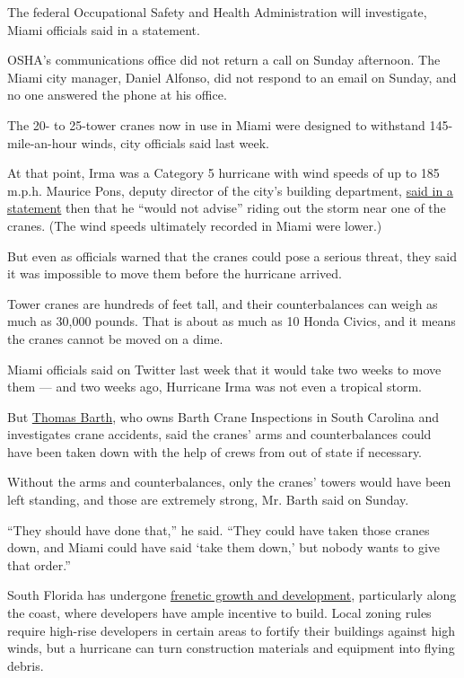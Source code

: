 The federal Occupational Safety and Health Administration will
investigate, Miami officials said in a statement.

OSHA's communications office did not return a call on Sunday afternoon.
The Miami city manager, Daniel Alfonso, did not respond to an email on
Sunday, and no one answered the phone at his office.

The 20- to 25-tower cranes now in use in Miami were designed to
withstand 145-mile-an-hour winds, city officials said last week.

At that point, Irma was a Category 5 hurricane with wind speeds of up to
185 m.p.h. Maurice Pons, deputy director of the city's building
department,
\href{https://twitter.com/CityofMiami/status/905185163558223872}{said in
a statement} then that he ``would not advise'' riding out the storm near
one of the cranes. (The wind speeds ultimately recorded in Miami were
lower.)

But even as officials warned that the cranes could pose a serious
threat, they said it was impossible to move them before the hurricane
arrived.

Tower cranes are hundreds of feet tall, and their counterbalances can
weigh as much as 30,000 pounds. That is about as much as 10 Honda
Civics, and it means the cranes cannot be moved on a dime.

Miami officials said on Twitter last week that it would take two weeks
to move them --- and two weeks ago, Hurricane Irma was not even a
tropical storm.

But \href{http://www.craneconsultant.com/about.php}{Thomas Barth}, who
owns Barth Crane Inspections in South Carolina and investigates crane
accidents, said the cranes' arms and counterbalances could have been
taken down with the help of crews from out of state if necessary.

Without the arms and counterbalances, only the cranes' towers would have
been left standing, and those are extremely strong, Mr. Barth said on
Sunday.

``They should have done that,'' he said. ``They could have taken those
cranes down, and Miami could have said `take them down,' but nobody
wants to give that order.''

South Florida has undergone
\href{https://www.nytimes3xbfgragh.onion/2017/09/07/climate/florida-hurricane-irma-damage.html}{frenetic
growth and development}, particularly along the coast, where developers
have ample incentive to build. Local zoning rules require high-rise
developers in certain areas to fortify their buildings against high
winds, but a hurricane can turn construction materials and equipment
into flying debris.

